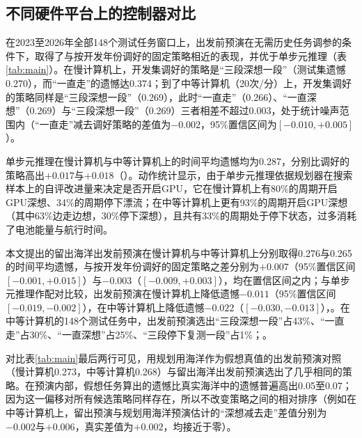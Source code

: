 \subsection{不同硬件平台上的控制器对比}

在2023至2026年全部148个测试任务窗口上，出发前预演在无需历史任务调参的条件下，取得了与按开发年份调好的固定策略相近的表现，并优于单步元推理（表\ref{tab:main}）。在慢计算机上，开发集调好的策略是“三段深想一段”（测试集遗憾0.270），而“一直走”的遗憾达0.374；到了中等计算机（20次/分）上，开发集调好的策略同样是“三段深想一段”（0.269），此时“一直走”（0.266）、“一直深想”（0.269）与“三段深想一段”（0.269）三者相差不超过0.003，处于统计噪声范围内（“一直走”减去调好策略的差值为$-0.002$，95\%置信区间为$[-0.010, +0.005]$）。

\begin{table}[htbp]
  \centering
  \caption{2023至2026年148个测试集任务（3天前卫星图，真实海洋偏离0.15，传感器误差0.1）上各控制方式的时间平均遗憾（越低越好）。“调好的”指在该型航行器的120个开发集任务上表现最好的固定策略；括号内为相对于“调好的”策略的差值，方括号内为按赤潮周自助重采样得到的95\%置信区间。}
  \label{tab:main}
  
\end{table}

单步元推理在慢计算机与中等计算机上的时间平均遗憾均为0.287，分别比调好的策略高出$+0.017$与$+0.018$（）。动作统计显示，由于单步元推理依据规划器在搜索样本上的自评改进量来决定是否开启GPU，它在慢计算机上有80\%的周期开启GPU深想、34\%的周期停下漂流；在中等计算机上更有93\%的周期开启GPU深想（其中63\%边走边想，30\%停下深想），且共有33\%的周期处于停下状态，过多消耗了电池能量与航行时间。

本文提出的留出海洋出发前预演在慢计算机与中等计算机上分别取得0.276与0.265的时间平均遗憾，与按开发年份调好的固定策略之差分别为$+0.007$（95\%置信区间$[-0.001, +0.015]$）与$-0.003$（$[-0.009, +0.003]$），均在置信区间之内；与单步元推理作配对比较，出发前预演在慢计算机上降低遗憾$-0.011$（95\%置信区间$[-0.019, -0.002]$），在中等计算机上降低遗憾$-0.022$（$[-0.030, -0.013]$），。在中等计算机的148个测试任务中，出发前预演选出“三段深想一段”占43\%、“一直走”占30\%、“一直深想”占25\%、“三段停下复测一段”占1\%；。

对比表\ref{tab:main}最后两行可见，用规划用海洋作为假想真值的出发前预演对照（慢计算机0.273，中等计算机0.268）与留出海洋出发前预演选出了几乎相同的策略。在预演内部，假想任务算出的遗憾比真实海洋中的遗憾普遍高出0.05至0.07；因为这一偏移对所有候选策略同样存在，所以不改变策略之间的相对排序（例如在中等计算机上，留出预演与规划用海洋预演估计的“深想减去走”差值分别为$-0.002$与$+0.006$，真实差值为$+0.002$，均接近于零）。


